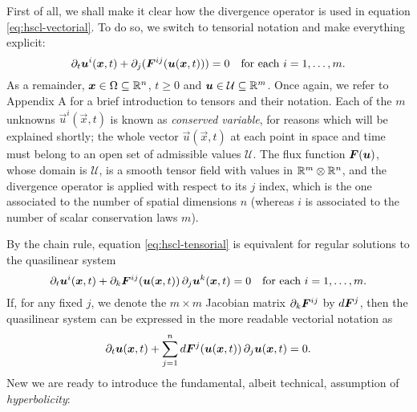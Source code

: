 First of all, we shall make it clear how the divergence operator
is used in equation \eqref{eq:hscl-vectorial}.
To do so, we switch to tensorial notation and make everything explicit:
\begin{equation} \label{eq:hscl-tensorial}
\partial_t \bm{u}^i(\bm{x},t) + \partial_j (\bm{F}^{ij}(\bm{u}(\bm{x},t))) = 0
\quad \text{for each $i = 1, \dots, m$.}
\end{equation}
As a remainder, $\bm{x} \in \Omega \subseteq \mathbb{R}^n$, $t \geq 0$ and
$\bm{u} \in \mathcal{U} \subseteq \mathbb{R}^m$.
Once again, we refer to Appendix A for a brief introduction
to tensors and their notation.
Each of the $m$ unknowns $\vec{u}^i(\vec{x},t)$ is known as
\emph{conserved variable}, for reasons which will be explained shortly;
the whole vector $\vec{u}(\vec{x},t)$ at each point in space and time must belong
to an open set of admissible values $\mathcal{U}$.
The flux function $\bm{F}(\bm{u})$, whose domain is $\mathcal{U}$,
is a smooth tensor field with values in $\mathbb{R}^m \otimes \mathbb{R}^n$,
and the divergence operator is applied with respect
to its $j$ index, which is the one associated to the number
of spatial dimensions $n$ (whereas $i$ is associated to the number of
scalar conservation laws $m$).

By the chain rule, equation \eqref{eq:hscl-tensorial} is equivalent
for regular solutions to the quasilinear system
\begin{equation} \label{eq:hscl-quasilinear-tensorial}
\partial_t \bm{u}^i(\bm{x},t)
+  \partial_k \bm{F}^{ij} (\bm{u}(\bm{x},t))
\, \partial_j \bm{u}^k (\bm{x},t) = 0
\quad \text{for each $i = 1, \dots, m$.}
\end{equation}
If, for any fixed $j$, we denote the $m \times m$ Jacobian matrix
$\partial_k \bm{F}^{ij}$ by $d\bm{F}^j$, then the quasilinear system
can be expressed in the more readable vectorial notation as
\begin{equation} \label{eq:hscl-quasilinear-vectorial}
\partial_t \bm{u}(\bm{x},t)
+ \sum_{j=1}^n d\bm{F}^j(\bm{u}(\bm{x},t))
\, \partial_j \bm{u}(\bm{x},t) = 0.
\end{equation}
New we are ready to introduce the fundamental, albeit technical,
assumption of \emph{hyperbolicity}:

